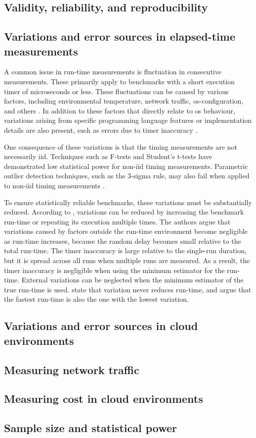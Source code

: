 \subsection{Validity, reliability, and reproducibility}
\subsection{Variations and error sources in elapsed-time measurements}
 A common issue in run-time measurements is fluctuation in consecutive measurements. These primarily apply to benchmarks with a short execution timer of microseconds or less. These fluctuations can be caused by various factors, including environmental temperature, network traffic, \acrshort{os}-configuration, and others \parencite{chen2016_robust_benchmarking_noisy_environments}. In addition to these factors that directly relate to \acrshort{os} behaviour, variations arising from specific programming language features or implementation details are also present, such as errors due to timer inaccuracy \parencite{chen2016_robust_benchmarking_noisy_environments}.

One consequence of these variations is that the timing measurements are not necessarily \MakeLowercase{\acrfull{iid}}. Techniques such as F-tests and Student's t-tests have demonstrated low statistical power for non-\acrshort{iid} timing measurements. Parametric outlier detection techniques, such as the 3-sigma rule, may also fail when applied to non-\acrshort{iid} timing measurements \parencite{chen2016_robust_benchmarking_noisy_environments, halkos2018_corporate_social_responsibility}.

To ensure statistically reliable benchmarks, these variations must be substantially reduced. According to \textcite{chen2016_robust_benchmarking_noisy_environments}, variations can be reduced by increasing the benchmark run-time or repeating its execution multiple times. The authors argue that variations caused by factors outside the run-time environment become negligible as run-time increases, because the random delay becomes small relative to the total run-time. The timer inaccuracy is large relative to the single-run duration, but it is spread across all runs when multiple runs are measured. As a result, the timer inaccuracy is negligible when using the minimum estimator for the run-time. External variations can be neglected when the minimum estimator of the true run-time is used. \textcite{chen2016_robust_benchmarking_noisy_environments} state that variation never reduces run-time, and argue that the fastest run-time is also the one with the lowest variation.

\subsection{Variations and error sources in cloud environments}
\subsection{Measuring network traffic}
\subsection{Measuring cost in cloud environments}
\subsection{Sample size and statistical power}